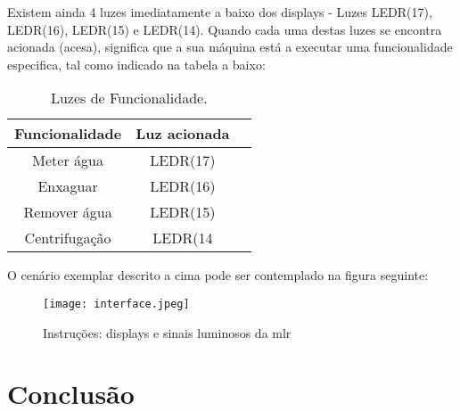 Existem ainda 4 luzes imediatamente a baixo dos displays - Luzes LEDR(17), LEDR(16), LEDR(15) e LEDR(14). Quando cada uma destas luzes se encontra acionada (acesa), significa que a sua máquina está a executar uma funcionalidade especifica, tal como indicado na tabela a baixo:


\begin{table}[H]
    \centering
    \caption{Luzes de Funcionalidade.}
    \begin{tabular}{|c|c|c|}\hline

        Funcionalidade 			& Luz acionada	\\ 
        \hline
	    Meter água 				& LEDR(17)		\\
	    Enxaguar			 	& LEDR(16) 		\\
	    Remover água 			& LEDR(15)		\\ 
		Centrifugação 			& LEDR(14		\\
				
    \hline
    \end{tabular}
    \label{tab.luzes_funcao}
\end{table}	


O cenário exemplar descrito a cima pode ser contemplado na figura seguinte:

\begin{figure}[H]
	\centering
	\texttt{[image: interface.jpeg]}
	\caption{Instruções: displays e sinais luminosos da \acf{mlr}}
	\label{fig:interface}
\end{figure}



%

\chapter{Conclusão}
\label{chap.conclusão}

